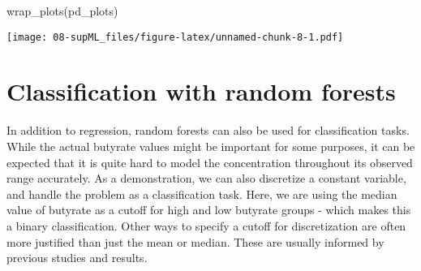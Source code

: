 \documentclass[
  oneside]{book}
\newenvironment{Shaded}{\begin{snugshade}}{\end{snugshade}}
\newcommand{\FunctionTok}[1]{\textcolor[rgb]{0.00,0.00,0.00}{#1}}
\newcommand{\NormalTok}[1]{#1}
\newcommand{\OtherTok}[1]{\textcolor[rgb]{0.56,0.35,0.01}{#1}}
\newcommand{\SpecialCharTok}[1]{\textcolor[rgb]{0.00,0.00,0.00}{#1}}
\newcommand{\StringTok}[1]{\textcolor[rgb]{0.31,0.60,0.02}{#1}}
\begin{document}
\begin{Shaded}
\begin{Highlighting}[]
\FunctionTok{wrap\_plots}\NormalTok{(pd\_plots)}
\end{Highlighting}
\end{Shaded}

\texttt{[image: 08-supML\_files/figure-latex/unnamed-chunk-8-1.pdf]}

\hypertarget{classification-with-random-forests}{%
\section{Classification with random forests}\label{classification-with-random-forests}}

In addition to regression, random forests can also be used for classification tasks.
While the actual butyrate values might be important for some purposes, it can be
expected that it is quite hard to model the concentration throughout its observed
range accurately. As a demonstration, we can also discretize a constant variable,
and handle the problem as a classification task. Here, we are using the median value
of butyrate as a cutoff for high and low butyrate groups - which makes this a binary
classification. Other ways to specify a cutoff for discretization are often more
justified than just the mean or median. These are usually informed by previous studies
and results.

\begin{Shaded}
\end{Shaded}
\end{document}
